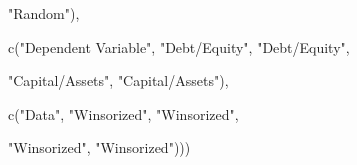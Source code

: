 \documentclass[a4paper,nobind]{templates/ociamthesis}
\newenvironment{Shaded}{\begin{snugshade}}{\end{snugshade}}
\newcommand{\FunctionTok}[1]{\textcolor[rgb]{0.00,0.00,0.00}{#1}}
\newcommand{\NormalTok}[1]{#1}
\newcommand{\StringTok}[1]{\textcolor[rgb]{0.31,0.60,0.02}{#1}}
\renewenvironment{Shaded}
{
  \vspace{10pt}%
  \begin{snugshade}%
}{%
  \end{snugshade}%
  \vspace{8pt}%
}
\begin{document}
\begin{landscape}
\begin{Shaded}
\begin{Highlighting}[]
                        \StringTok{"Random"}\NormalTok{), }
                        
          \FunctionTok{c}\NormalTok{(}\StringTok{"Dependent Variable"}\NormalTok{, }\StringTok{"Debt/Equity"}\NormalTok{, }\StringTok{"Debt/Equity"}\NormalTok{,}
                          
                          \StringTok{"Capital/Assets"}\NormalTok{, }\StringTok{"Capital/Assets"}\NormalTok{),}
          
          \FunctionTok{c}\NormalTok{(}\StringTok{"Data"}\NormalTok{, }\StringTok{"Winsorized"}\NormalTok{, }\StringTok{"Winsorized"}\NormalTok{, }
            
            \StringTok{"Winsorized"}\NormalTok{, }\StringTok{"Winsorized"}\NormalTok{)))}
\end{Highlighting}
\end{Shaded}


\end{landscape}
\end{document}
